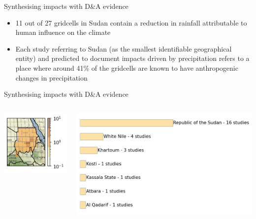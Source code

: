 \documentclass[9pt]{beamer}
\begin{document}
\begin{frame}{Synthesising impacts with D\&A evidence}
\begin{itemize}
	\item 11 out of 27 gridcells in Sudan contain a reduction in rainfall attributable to human influence on the climate
	\item Each study referring to Sudan (as the smallest identifiable geographical entity)  and predicted to document impacts driven by precipitation refers to a place where around 41\% of the gridcells are known to have anthropogenic changes in precipitation
\end{itemize}
\end{frame}

\begin{frame}{Synthesising impacts with D\&A evidence}
\begin{columns}
\begin{column}{0.4\linewidth}
	\includegraphics[width=\linewidth]{../plots/maps/sudan_precipitation_studies.png}
\end{column}

\begin{column}{0.4\linewidth}
	\includegraphics[width=\linewidth]{../plots/maps/sudan_precipitation_study_places.png}
\end{column}
\end{columns}


\end{frame}
\end{document}
